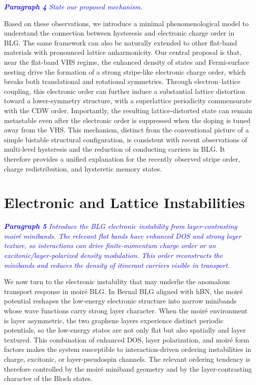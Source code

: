 \documentclass[aps,prx,article,twocolumn,amsmath,amssymb,superscriptaddress,longbibliography]{revtex4-2}
\begin{document}
\textcolor{blue}{\itshape \textbf{Paragraph 4}
State our proposed mechanism. }

Based on these observations, we introduce a minimal phenomenological model to understand the connection between hysteresis and electronic charge order in BLG. The same framework can also be naturally extended to other flat-band materials with pronounced lattice anharmonicity. Our central proposal is that, near the flat-band VHS regime, the enhanced density of states and Fermi-surface nesting drive the formation of a strong stripe-like electronic charge order, which breaks both translational and rotational symmetries. Through electron--lattice coupling, this electronic order can further induce a substantial lattice distortion toward a lower-symmetry structure, with a superlattice periodicity commensurate with the CDW order. Importantly, the resulting lattice-distorted state can remain metastable even after the electronic order is suppressed when the doping is tuned away from the VHS. This mechanism, distinct from the conventional picture of a simple bistable structural configuration, is consistent with recent observations of multi-level hysteresis and the reduction of conducting carriers in BLG. It therefore provides a unified explanation for the recently observed stripe order, charge redistribution, and hysteretic memory states.





\section{Electronic and Lattice Instabilities}

\textcolor{blue}{\itshape \textbf{Paragraph 5}
Introduce the BLG electronic instability from layer-contrasting moiré minibands. The relevant flat bands have enhanced DOS and strong layer texture, so interactions can drive finite-momentum charge order or an excitonic/layer-polarized density modulation. This order reconstructs the minibands and reduces the density of itinerant carriers visible in transport.}

We now turn to the electronic instability that may underlie the anomalous transport response in moiré BLG. In Bernal BLG aligned with hBN, the moiré potential reshapes the low-energy electronic structure into narrow minibands whose wave functions carry strong layer character. When the moiré environment is layer asymmetric, the two graphene layers experience distinct periodic potentials, so the low-energy states are not only flat but also spatially and layer textured. This combination of enhanced DOS, layer polarization, and moiré form factors makes the system susceptible to interaction-driven ordering instabilities in charge, excitonic, or layer-pseudospin channels. The relevant ordering tendency is therefore controlled by the moiré miniband geometry and by the layer-contrasting character of the Bloch states.
\end{document}
